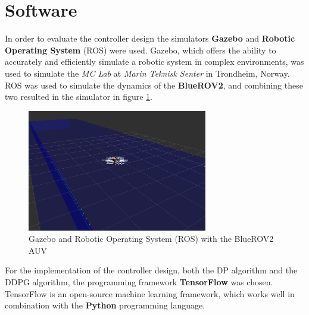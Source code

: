 \section{Software}
In order to evaluate the controller design the simulators \textbf{Gazebo} and \textbf{Robotic Operating System} (ROS) were used. Gazebo, which offers the ability to accurately and efficiently simulate a robotic system in complex environments, was used to simulate the \textit{MC Lab} at \textit{Marin Teknisk Senter} in Trondheim, Norway. ROS was used to simulate the dynamics of the \textbf{BlueROV2}, and combining these two resulted in the simulator in figure \ref{fig:ros}. 
\begin{figure}[H]
    \centering
    \includegraphics[width=0.7\textwidth]{images/chap4/ROS.png}
    \caption{Gazebo and Robotic Operating System (ROS) with the BlueROV2 AUV}
    \label{fig:ros}
\end{figure}
For the implementation of the controller design, both the DP algorithm and the DDPG algorithm, the programming framework \textbf{TensorFlow} was chosen. TensorFlow is an open-source machine learning framework, which works well in combination with the \textbf{Python} programming language. 
